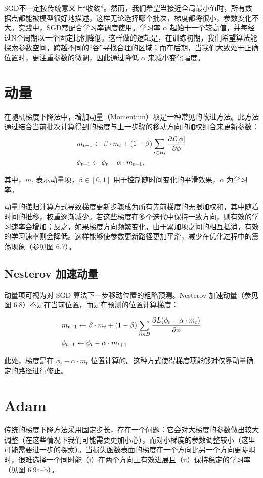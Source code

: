 SGD不一定按传统意义上“收敛”。然而，我们希望当接近全局最小值时，所有数据点都能被模型很好地描述，这样无论选择哪个批次，梯度都将很小，参数变化不大。实践中，SGD常配合学习率调度使用。学习率 \(\alpha\) 起始于一个较高值，并每经过N个周期以一个固定比例降低。这样做的逻辑是，在训练初期，我们希望算法能探索参数空间，跨越不同的“谷”寻找合理的区域；而在后期，当我们大致处于正确位置时，更注重参数的微调，因此通过降低 \(\alpha\) 来减小变化幅度。

\section{动量}
在随机梯度下降法中，增加动量（Momentum）项是一种常见的改进方法。此方法通过结合当前批次计算得到的梯度与上一步骤的移动方向的加权组合来更新参数：
\begin{align}
& m_{t+1} \leftarrow \beta \cdot m_t + (1 - \beta) \sum_{i \in B_t} \frac{\partial \mathcal{L}[\phi]}{\partial \phi} \notag \\
& \phi_{t+1} \leftarrow \phi_t - \alpha \cdot m_{t+1},
\end{align}

其中，\(m_t\) 表示动量项，\(\beta \in [0,1]\) 用于控制随时间变化的平滑效果，\(\alpha\) 为学习率。

动量的递归计算方式导致梯度更新步骤成为所有先前梯度的无限加权和，其中随着时间的推移，权重逐渐减少。若这些梯度在多个迭代中保持一致方向，则有效的学习速率会增加；反之，如果梯度方向频繁变化，由于累加项之间的相互抵消，有效的学习速率则会降低。这样能够使参数更新路径更加平滑，减少在优化过程中的震荡现象（参见图 6.7）。

\subsection{Nesterov 加速动量}
动量项可视为对 SGD 算法下一步移动位置的粗略预测。Nesterov 加速动量（参见图 6.8）不是在当前位置，而是在预测的位置计算梯度：


\begin{align}
& m_{t+1} \leftarrow \beta \cdot m_t + (1 - \beta) \sum_{i in B} \frac{\partial L(\phi_t - \alpha \cdot m_t)}{\partial \phi} \notag \\
& \phi_{t+1} \leftarrow \phi_t - \alpha \cdot m_{t+1} 
\end{align} 


此处，梯度是在 \(\phi_t - \alpha \cdot m_t\) 位置计算的。这种方式使得梯度项能够对仅靠动量确定的路径进行修正。

\section{Adam}
传统的梯度下降方法采用固定步长，存在一个问题：它会对大梯度的参数做出较大调整（在这些情况下我们可能需要更加小心），而对小梯度的参数调整较小（这里可能需要进一步的探索）。当损失函数表面的梯度在一个方向比另一个方向更陡峭时，很难选择一个同时能（i）在两个方向上有效进展且（ii）保持稳定的学习率（见图 6.9a–b）。

